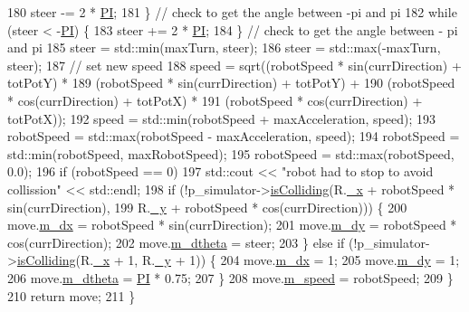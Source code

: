 \begin{DoxyCode}
180       steer -= 2 * \hyperlink{Actor_8hpp_a598a3330b3c21701223ee0ca14316eca}{PI};
181     \}  \textcolor{comment}{//  check to get the angle between -pi and pi}
182     \textcolor{keywordflow}{while} (steer < -\hyperlink{Actor_8hpp_a598a3330b3c21701223ee0ca14316eca}{PI}) \{
183       steer += 2 * \hyperlink{Actor_8hpp_a598a3330b3c21701223ee0ca14316eca}{PI};
184     \}  \textcolor{comment}{//  check to get the angle between - pi and pi}
185     steer = std::min(maxTurn, steer);
186     steer = std::max(-maxTurn, steer);
187     \textcolor{comment}{//  set new speed}
188     speed = sqrt((robotSpeed * sin(currDirection) + totPotY) *
189                  (robotSpeed * sin(currDirection) + totPotY) +
190                  (robotSpeed * cos(currDirection) + totPotX) *
191                  (robotSpeed * cos(currDirection) + totPotX));
192     speed = std::min(robotSpeed + maxAcceleration, speed);
193     robotSpeed = std::max(robotSpeed - maxAcceleration, speed);
194     robotSpeed = std::min(robotSpeed, maxRobotSpeed);
195     robotSpeed = std::max(robotSpeed, 0.0);
196     \textcolor{keywordflow}{if} (robotSpeed == 0)
197       std::cout << \textcolor{stringliteral}{"robot had to stop to avoid collission"} << std::endl;
198     \textcolor{keywordflow}{if} (!p\_simulator->\hyperlink{classRobotSimulator_a564d79ead199c034841eda1b3ebebfcd}{isColliding}(R.\hyperlink{structPoint_a77b9bd094b57efb7c185fdb3fb781900}{\_x} + robotSpeed * sin(currDirection),
199                                   R.\hyperlink{structPoint_aa8be383c30dee092979999b523373658}{\_y} + robotSpeed * cos(currDirection))) \{
200       move.\hyperlink{structRobotMove_aeb93adca1b150538c56a548fb3a060f7}{m\_dx} = robotSpeed * sin(currDirection);
201       move.\hyperlink{structRobotMove_a8da71ddc10ffe34d3cc0f9d0cb26e33c}{m\_dy} = robotSpeed * cos(currDirection);
202       move.\hyperlink{structRobotMove_a667d60a557ec5177f77cd0bcf98ba84b}{m\_dtheta} = steer;
203     \} \textcolor{keywordflow}{else} \textcolor{keywordflow}{if} (!p\_simulator->\hyperlink{classRobotSimulator_a564d79ead199c034841eda1b3ebebfcd}{isColliding}(R.\hyperlink{structPoint_a77b9bd094b57efb7c185fdb3fb781900}{\_x} + 1, R.\hyperlink{structPoint_aa8be383c30dee092979999b523373658}{\_y} + 1)) \{
204       move.\hyperlink{structRobotMove_aeb93adca1b150538c56a548fb3a060f7}{m\_dx} = 1;
205       move.\hyperlink{structRobotMove_a8da71ddc10ffe34d3cc0f9d0cb26e33c}{m\_dy} = 1;
206       move.\hyperlink{structRobotMove_a667d60a557ec5177f77cd0bcf98ba84b}{m\_dtheta} = \hyperlink{Actor_8hpp_a598a3330b3c21701223ee0ca14316eca}{PI} * 0.75;
207     \}
208     move.\hyperlink{structRobotMove_a9b6595c240cc17c54b4436c592c5c6b9}{m\_speed} = robotSpeed;
209   \}
210   \textcolor{keywordflow}{return} move;
211 \}
\end{DoxyCode}


